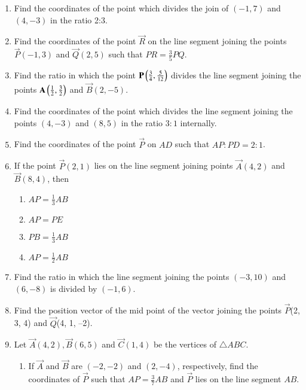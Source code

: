 \begin{enumerate}[label=\thesubsection.\arabic*,ref=\thesubsection.\theenumi]
\item Find the coordinates of the point which divides the join of $(-1,7) $ and $ (4,-3)$ in the ratio 2:3.
	\\
		\solution
	
\item Find the coordinates of the point $\vec{R}$ on the line segment joining the points $\vec{P}(-1,3)$ and $\vec{Q}(2,5)$ such that $PR=\frac{3}{5}PQ$.
\item Find the ratio in which the point $\mathbf{P}\left(\frac{3}{4},\frac{5}{12}\right)$ divides the line segment joining the points $\mathbf{A}\left(\frac{1}{2},\frac{3}{2}\right)$ and $ \vec{B}(2,-5)$.
\item Find the coordinates of the point which divides the line segment joining the points $(4,-3)$ and $(8,5)$ in the ratio $3:1$ internally.
\item Find the coordinates of the point $\vec{P}$ on $AD$ such that $AP : PD = 2 : 1$.
\item If the point $\vec{P} (2, 1)$ lies on the line segment joining points $\vec{A} (4, 2)$  and $ \vec{B} (8, 4)$,
then
\begin{enumerate}
	\item $AP =\frac{1}{3}{AB}$ 
\item ${AP}={PE}$
\item ${PB}=\frac{1}{3}{AB}$
\item${AP}=\frac{1}{2}{AB}$
 \end{enumerate}
\item Find the ratio in which the line segment joining the points $(-3,10)$  and  $(6,-8)$  is divided by $ (-1,6)$.
	\\
		\solution
	
\item Find the position vector of the mid point of the vector joining the points $\vec{P}$(2, 3, 4)
and $\vec{Q}$(4, 1, –2).
\\
\solution
		
\item Let $\vec{A}(4, 2), \vec{B}(6, 5)$  and $ \vec{C}(1, 4)$ be the vertices of $\triangle ABC$.
\begin{enumerate}
\item If $\vec{A}$ and  $\vec{B}$ are $(-2,-2)$ and  $(2,-4)$, respectively, find the coordinates of $\vec{P}$ such that $AP= \frac {3}{7}AB$  and $ \vec{P}$ lies on the line segment $AB$.
	\\

\end{enumerate}
\end{enumerate}
